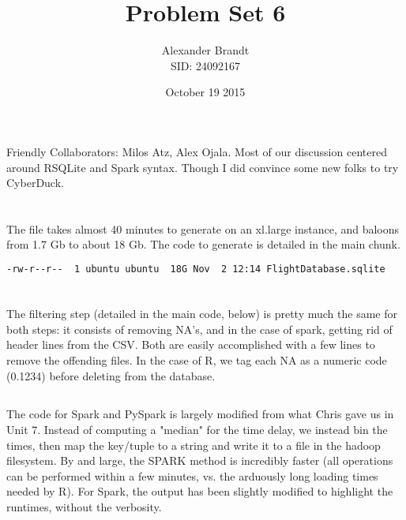 \documentclass{article}\usepackage[]{graphicx}\usepackage[]{color}
\title{Problem Set 6}
\author{Alexander Brandt\\SID: 24092167}
\date{October 19 2015}
\begin{document}
\maketitle

Friendly Collaborators: Milos Atz, Alex Ojala.  Most of our discussion centered around RSQLite and Spark syntax.  Though I did convince some new folks to try CyberDuck.

\section{}

The file takes almost 40 minutes to generate on an xl.large instance, and baloons from 1.7 Gb to about 18 Gb.  The code to generate is detailed in the main chunk. \\

\begin{lstlisting}[language=bash,caption={ls results}]
-rw-r--r--  1 ubuntu ubuntu  18G Nov  2 12:14 FlightDatabase.sqlite
\end{lstlisting}

\section{}

\subsection{}

The filtering step (detailed in the main code, below) is pretty much the same for both steps: it consists of removing NA's, and in the case of spark, getting rid of header lines from the CSV.  Both are easily accomplished with a few lines to remove the offending files.  In the case of R, we tag each NA as a numeric code (0.1234) before deleting from the database.

\subsection{}

The code for Spark and PySpark is largely modified from what Chris gave us in Unit 7.  Instead of computing a "median" for the time delay, we instead bin the times, then map the key/tuple to a string and write it to a file in the hadoop filesystem.  By and large, the SPARK method is incredibly faster (all operations can be performed within a few minutes, vs. the arduously long loading times needed by R).  For Spark, the output has been slightly modified to highlight the runtimes, without the verbosity.
\end{document}
